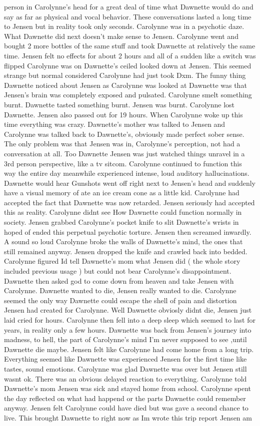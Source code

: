 \documentclass[12pt]{book}
\begin{document}
person in Carolynne's head for a great deal of time what Dawnette would do and say as far as physical and vocal behavior. These conversations lasted a long time to Jensen but in reality took only seconds. Carolynne was in a psychotic daze. What Dawnette did next doesn't make sense to Jensen. Carolynne went and bought 2 more bottles of the same stuff and took Dawnette at relatively the same time. Jensen felt no effects for about 2 hours and all of a sudden like a switch was flipped Carolynne was on Dawnette's ceiled looked down at Jensen. This seemed strange but normal considered Carolynne had just took Dxm. The funny thing Dawnette noticed about Jensen as Carolynne was looked at Dawnette was that Jensen's brain was completely exposed and pulsated. Carolynne smelt something burnt. Dawnette tasted something burnt. Jensen was burnt. Carolynne lost Dawnette. Jensen also passed out for 19 hours. When Carolynne woke up this time everything was crazy. Dawnette's mother was talked to Jensen and Carolynne was talked back to Dawnette's, obviously made perfect sober sense. The only problem was that Jensen was in, Carolynne's perception, not had a conversation at all. Too Dawnette Jensen was just watched things unravel in a 3rd person perspective, like a tv sitcom. Carolynne continued to function this way the entire day meanwhile experienced intense, loud auditory hallucinations. Dawnette would hear Gunshots went off right next to Jensen's head and suddenly have a visual memory of ate an ice cream cone as a little kid. Carolynne had accepted the fact that Dawnette was now retarded. Jensen seriously had accepted this as reality. Carolynne didnt see How Dawnette could function normally in society. Jensen grabbed Carolynne's pocket knife to slit Dawnette's wrists in hoped of ended this perpetual psychotic torture. Jensen then screamed inwardly. A sound so loud Carolynne broke the walls of Dawnette's mind, the ones that still remained anyway. Jensen dropped the knife and crawled back into bedded. Carolynne figured Id tell Dawnette's mom what Jensen did ( the whole story included previous usage ) but could not bear Carolynne's disappointment. Dawnette then asked god to come down from heaven and take Jensen with Carolynne. Dawnette wanted to die, Jensen really wanted to die. Carolynne seemed the only way Dawnette could escape the shell of pain and distortion Jensen had created for Carolynne. Well Dawnette obviosly didnt die, Jensen just laid cried for hours. Carolynne then fell into a deep sleep which seemed to last for years, in reality only a few hours. Dawnette was back from Jensen's journey into madness, to hell, the part of Carolynne's mind I'm never supposed to see ,until Dawnette die maybe. Jensen felt like Carolynne had come home from a long trip. Everything seemed like Dawnette was experienced Jensen for the first time like tastes, sound emotions. Carolynne was glad Dawnette was over but Jensen still wasnt ok. There was an obvious delayed reaction to everything. Carolynne told Dawnette's mom Jensen was sick and stayed home from school. Carolynne spent the day reflected on what had happend or the parts Dawnette could remember anyway. Jensen felt Carolynne could have died but was gave a second chance to live. This brought Dawnette to right now as Im wrote this trip report Jensen am 
\end{document}
